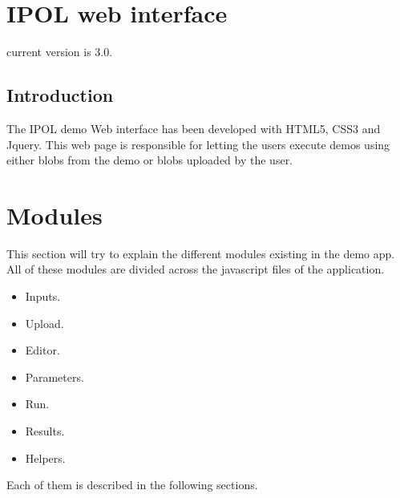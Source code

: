 
\section{IPOL web interface}

current version is 3.0.

\subsection{Introduction}
The IPOL demo Web interface has been developed with HTML5, CSS3  and Jquery. 
This web page is responsible for letting the users execute demos using either blobs 
from the demo or blobs uploaded by the user. 



\section{Modules}
This section will try to explain the different modules existing in the demo app. All of these
 modules are divided across the javascript files of the application.
\begin{itemize}
	\item Inputs.
	\item Upload.
	\item Editor.
	\item Parameters.
	\item Run.
	\item Results.
	\item Helpers. 
\end{itemize}

Each of them is described in the following sections.

